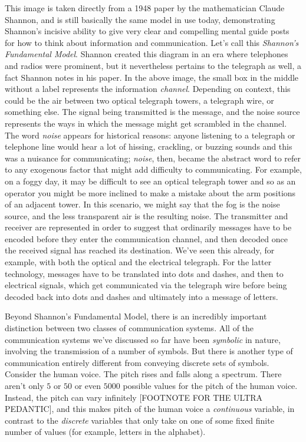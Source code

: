 \documentclass[UTF8]{book}
\begin{document}
\begin{CJK}{UTF8}{gbsn}
This image is taken directly from a 1948 paper by the mathematician Claude Shannon, and is still basically the same model in use today, demonstrating Shannon's incisive ability to give very clear and compelling mental guide posts for how to think about information and communication. Let's call this \emph{Shannon's Fundamental Model}. Shannon created this diagram in an era where telephones and radios were prominent, but it nevertheless pertains to the telegraph as well, a fact Shannon notes in his paper. In the above image, the small box in the middle without a label represents the information \emph{channel}. Depending on context, this could be the air between two optical telegraph towers, a telegraph wire, or something else. The signal being transmitted is the message, and the noise source represents the ways in which the message might get scrambled in the channel. The word \emph{noise} appears for historical reasons: anyone listening to a telegraph or telephone line would hear a lot of hissing, crackling, or buzzing sounds and this was a nuisance for communicating; \emph{noise}, then, became the abstract word to refer to any exogenous factor that might add difficulty to communicating. For example, on a foggy day, it may be difficult to see an optical telegraph tower and so as an operator you might be more inclined to make a mistake about the arm positions of an adjacent tower. In this scenario, we might say that the fog is the noise source, and the less transparent air is the resulting noise. The transmitter and receiver are represented in order to suggest that ordinarily messages have to be encoded before they enter the communication channel, and then decoded once the received signal has reached its destination. We've seen this already, for example, with both the optical and the electrical telegraph. For the latter technology, messages have to be translated into dots and dashes, and then to electrical signals, which get communicated via the telegraph wire before being decoded back into dots and dashes and ultimately into a message of letters.

Beyond Shannon's Fundamental Model, there is an incredibly important distinction between two classes of communication systems. All of the communication systems we've discussed so far have been \emph{symbolic} in nature, involving the transmission of a number of symbols. But there is another type of communication entirely different from conveying discrete sets of symbols. Consider the human voice. The pitch rises and falls along a spectrum. There aren't only $5$ or $50$ or even $5000$ possible values for the pitch of the human voice. Instead, the pitch can vary infinitely [FOOTNOTE FOR THE ULTRA PEDANTIC], and this makes pitch of the human voice a \emph{continuous} variable, in contrast to the \emph{discrete} variables that only take on one of some fixed finite number of values (for example, letters in the alphabet).


\end{CJK}
\end{document}
